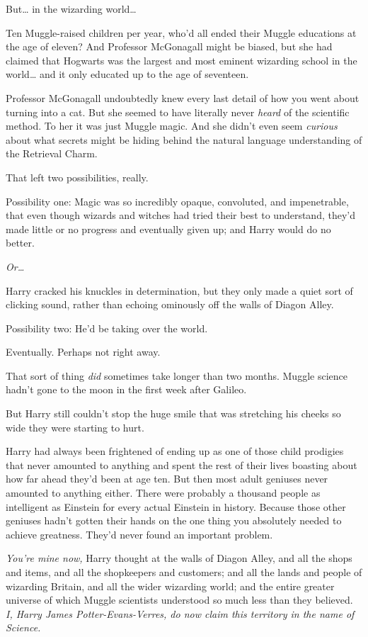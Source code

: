 But\ldots{} in the wizarding world\ldots{}

Ten Muggle-raised children per year, who'd all ended their Muggle
educations at the age of eleven? And Professor McGonagall might be
biased, but she had claimed that Hogwarts was the largest and most
eminent wizarding school in the world\ldots{} and it only educated up to
the age of seventeen.

Professor McGonagall undoubtedly knew every last detail of how you went
about turning into a cat. But she seemed to have literally never
\emph{heard} of the scientific method. To her it was just Muggle magic.
And she didn't even seem \emph{curious} about what secrets might be
hiding behind the natural language understanding of the Retrieval Charm.

That left two possibilities, really.

Possibility one: Magic was so incredibly opaque, convoluted, and
impenetrable, that even though wizards and witches had tried their best
to understand, they'd made little or no progress and eventually given
up; and Harry would do no better.

\emph{Or\ldots{}}

Harry cracked his knuckles in determination, but they only made a quiet
sort of clicking sound, rather than echoing ominously off the walls of
Diagon Alley.

Possibility two: He'd be taking over the world.

Eventually. Perhaps not right away.

That sort of thing \emph{did} sometimes take longer than two months.
Muggle science hadn't gone to the moon in the first week after Galileo.

But Harry still couldn't stop the huge smile that was stretching his
cheeks so wide they were starting to hurt.

Harry had always been frightened of ending up as one of those child
prodigies that never amounted to anything and spent the rest of their
lives boasting about how far ahead they'd been at age ten. But then most
adult geniuses never amounted to anything either. There were probably a
thousand people as intelligent as Einstein for every actual Einstein in
history. Because those other geniuses hadn't gotten their hands on the
one thing you absolutely needed to achieve greatness. They'd never found
an important problem.

\emph{You're mine now,} Harry thought at the walls of Diagon Alley, and
all the shops and items, and all the shopkeepers and customers; and all
the lands and people of wizarding Britain, and all the wider wizarding
world; and the entire greater universe of which Muggle scientists
understood so much less than they believed. \emph{I, Harry James
Potter-Evans-Verres, do now claim this territory in the name of
Science.}

